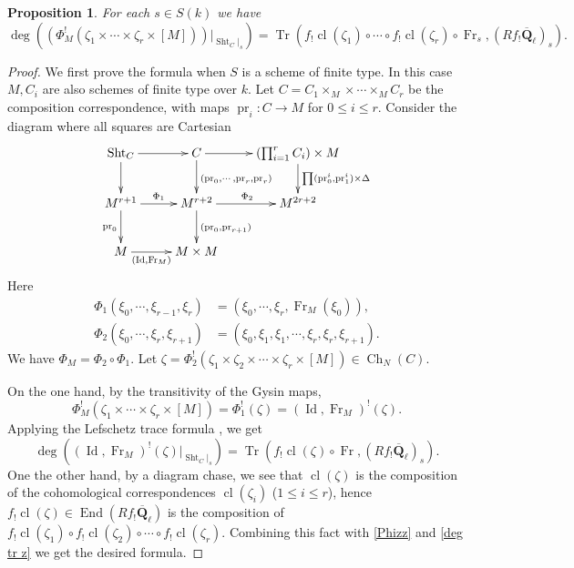 \documentclass[reqno]{amsart}
\numberwithin{equation}{section}
\newcommand{\Q}{\mathbf{Q}}
\DeclareMathOperator{\Frob}{Fr}
\DeclareMathOperator{\Tr}{Tr}
\DeclareMathOperator{\End}{End}
\DeclareMathOperator{\Id}{Id}
\DeclareMathOperator{\Sht}{Sht}
\DeclareMathOperator{\cla}{cl}
\DeclareMathOperator{\pr}{pr}
\DeclareMathOperator{\Ch}{Ch}
\newcommand{\Qlbar}{\overline{\Q}_\ell}
\renewcommand\c{\circ}
\newcommand{\z}{\zeta}
\newtheorem{prop}[thm]{Proposition}
\theoremstyle{remark}
\numberwithin{equation}{section}
\begin{document}
\begin{prop}\label{p:Lef} For each $s\in S(k)$ we have
\begin{equation*}
\deg((\Phi_{M}^{!}(\z_{1}\times\cdots\times\z_{r} \times [M] ))|_{\Sht_{C}|_s})=\Tr(f_{!}\cla(\z_{1})\c\cdots\c f_{!}\cla(\z_{r})\c\Frob_{s}, (Rf_{!}\Qlbar)_{s}).
\end{equation*}
\end{prop}
\begin{proof} We first prove the formula when $S$ is a scheme of finite type.  In this case $M,C_{i}$ are also schemes of finite type over $k$. Let $C=C_{1}\times_{M}\times\cdots\times_{M}C_{r}$ be the composition correspondence, with maps $\pr_{i}: C\to M$ for $0\le i\le r$.  Consider the diagram where all squares are Cartesian
\begin{equation}
\xymatrix{\Sht_{C}\ar[d] \ar[r] & C \ar[r]\ar[d]^{(\pr_{0},\cdots, \pr_{r}, \pr_r)} & (\prod_{i=1}^{r}C_{i} ) \times M\ar[d]^{\prod (\pr^{i}_{0}, \pr^{i}_{1}) \times \Delta}\\
M^{r+1} \ar[d]_{\pr_{0}} \ar[r]^{\Phi_{1}} & M^{r+2}\ar[d]^{(\pr_{0}, \pr_{r+1})} \ar[r]^{\Phi_{2}} & M^{2r+2}\\
M\ar[r]_-{(\Id,\Frob_{M})} & M\times M}
\end{equation}
Here
\begin{align*}
\Phi_{1}(\xi_{0},\cdots,  \xi_{r-1}, \xi_r) & =(\xi_{0},\cdots, \xi_r, \Frob_{M}(\xi_{0})),\\
\Phi_{2}(\xi_{0},\cdots, \xi_r,\xi_{r+1}) & =(\xi_{0},\xi_{1},\xi_{1},\cdots,\xi_{r},\xi_{r}, \xi_{r+1}).
\end{align*}
We have $\Phi_{M}=\Phi_{2}\c\Phi_{1}$. Let $\z=\Phi_{2}^{!}(\z_{1}\times\z_{2}\times\cdots\times\z_{r} \times [M])\in \Ch_{N}(C)$. 

On the one hand, by the transitivity of the Gysin maps, 
\begin{equation}\label{Phizz}
\Phi^{!}_{M}(\z_{1}\times\cdots\times\z_{r} \times [M] )=\Phi_{1}^{!}(\z)=(\Id,\Frob_{M})^{!}(\z).
\end{equation}
Applying the Lefschetz trace formula \cite[Proposition  A.12]{YZ}, we get
\begin{equation}\label{deg tr z}
\deg((\Id,\Frob_{M})^{!}(\z)|_{\Sht_{C}|_s})=\Tr(f_{!}\cla(\z)\c \Frob, (Rf_{!}\Qlbar)_{s}).
\end{equation}
One the other hand, by a diagram chase, we see that $\cla(\z)$ is the composition of the cohomological correspondences $\cla(\z_{i})$ ($1\le i\le r$), hence $f_{!}\cla(\z)\in \End(Rf_{!}\Qlbar)$ is the composition of $f_{!}\cla(\z_{1})\c f_{!}\cla(\z_{2})\c\cdots\c f_{!}\cla(\z_{r})$. Combining this fact with \eqref{Phizz} and \eqref{deg tr z} we get the desired formula.


\end{proof}
\end{document}
